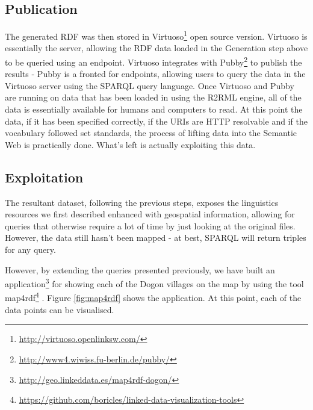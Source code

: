 \subsection{Publication}\label{sec:pub}
The generated RDF was then stored in Virtuoso\footnote{\url{http://virtuoso.openlinksw.com/}} open source version. Virtuoso is essentially the server, allowing the RDF data loaded in the Generation step above to be queried using an endpoint. Virtuoso integrates with Pubby\footnote{\url{http://www4.wiwiss.fu-berlin.de/pubby/}} to publish the results - Pubby is a fronted for endpoints, allowing users to query the data in the Virtuoso server using the SPARQL query language. Once Virtuoso and  Pubby are running on data that has been loaded in using the R2RML engine, all of the data is essentially available for humans and computers to read. At this point the data, if it has been specified correctly, if the URIs are HTTP resolvable and if the vocabulary followed set standards, the process of lifting data into the Semantic Web is practically done.  What's left is actually exploiting this data. 

\subsection{Exploitation}
The resultant dataset, following the previous steps, exposes the linguistics resources we first described enhanced with geospatial information, allowing for queries that otherwise require a lot of time by just looking at the original files. However, the data still hasn't been mapped - at best, SPARQL will return triples for any query. 

However, by extending the queries presented previously, we have built an application\footnote{\url{http://geo.linkeddata.es/map4rdf-dogon/}} for showing each of the Dogon villages on the map by using the tool map4rdf\footnote{\url{https://github.com/boricles/linked-data-visualization-tools}} \cite{deLeon_2012}. Figure \ref{fig:map4rdf} shows the application. At this point, each of the data points can be visualised. 


